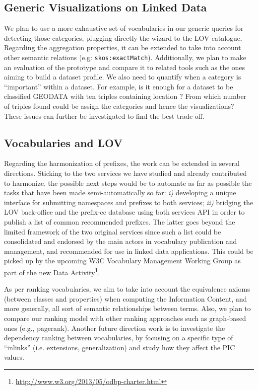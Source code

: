 \subsection{Generic Visualizations on Linked Data}
 We plan to use a more exhaustive set of vocabularies in our generic queries for detecting those categories, plugging directly the wizard to the LOV catalogue. Regarding the aggregation properties, it can be extended to take into account other semantic relations (e.g: \texttt{skos:exactMatch}). Additionally, we plan to make an evaluation of the prototype and compare it to related tools such as the ones aiming to build a dataset profile. We also need to quantify when a category is ``important'' within a dataset. For example, is it enough for a dataset to be classified GEODATA with ten triples containing location ? From which number of triples found could be assign the categories and hence the visualizations? These issues can further be investigated to find the best trade-off. 
 
\subsection{Vocabularies and LOV}
\label{sec:nextSteps}
Regarding the harmonization of prefixes, the work can be extended in several directions. Sticking to the two services we have studied and already contributed to harmonize, the possible next steps would be to automate as far as possible the tasks that have been made semi-automatically so far: \emph{i)} developing a unique interface for submitting namespaces and prefixes to both services; \emph{ii)} bridging the LOV back-office and the prefix-cc database using both services API in order to publish a list of common recommended prefixes. The latter goes beyond the limited framework of the two original services since such a list could be consolidated and endorsed by the main actors in vocabulary publication and management, and recommended for use in linked data applications. This could be picked up by the upcoming W3C Vocabulary Management Working Group as part of the new Data Activity\footnote{\url{http://www.w3.org/2013/05/odbp-charter.html}}.

 As per ranking vocabularies, we aim to take into account the equivalence axioms (between classes and properties) when computing the Information Content, and more generally, all sort of semantic relationships between terms. Also, we plan to compare our ranking model with other ranking approaches such as graph-based ones (e.g., pagerank). Another future direction work is to investigate the dependency ranking between vocabularies, by focusing on a specific type of ``inlinks'' (i.e. extensions, generalization) and study how they affect the PIC values.

